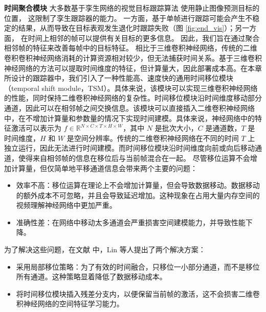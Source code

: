 \textbf{时间聚合模块}
大多数基于孪生网络的视觉目标跟踪算法 \cite{SiamRPN++, Wang2018SiamMask} 使用静止图像预测目标的位置，%
这限制了孪生跟踪器的能力。
一方面，基于单帧进行跟踪可能会产生不稳定的结果，从而导致在目标表观发生退化时跟踪失败（图 \ref{fig:end_vis}）；另一方面，
在时间上相邻的帧可以提供有关目标的更多信息。
因此，我们旨在通过聚合相邻帧的特征来改善每帧中的目标特征。
相比于三维卷积神经网络，传统的二维卷积卷积神经网络消耗的计算资源相对较少，但无法捕获时间关系。基于三维卷积神经网络的方法可以提取时间维度的特征，但计算量大，因此部署成本高。在本章所设计的跟踪器中，我们引入了一种性能高、速度快的通用时间移位模块（temporal shift module，TSM）\cite{lin2019tsm}。具体来说，该模块可以实现三维卷积神经网络的性能，同时保持二维卷积神经网络的复杂性。时间移位模块沿时间维度移动部分通道，因此可以在相邻帧之间交换信息。该模块可以直接插入二维卷积神经网络中，在不增加计算量和参数量的情况下实现时间建模。具体来说，神经网络中的特征激活可以表示为 $f \in \mathbb R^{N\times C\times T\times H\times W}$，其中 $N$ 是批次大小，$C$ 是通道数，$T$ 是时间维度，$H$ 和 $W$ 是空间分辨率。传统的二维卷积神经网络在不同的时间 $T$ 上独立运行，因此无法进行时间建模。而时间移位模块沿时间维度向前或向后移动通道，使得来自相邻帧的信息在移位后与当前帧混合在一起。
尽管移位运算不会增加计算量，但仅简单地平移通道信息会带来两个主要的问题：
\begin{itemize}
\item 效率不高：移位运算在理论上不会增加计算量，但会导致数据移动。数据移动的额外成本不可忽略，并且会导致延迟增加。这种现象在占用大量内存空间的视频理解神经网络中更加严重。
\item 准确性差：在网络中移动太多通道会严重损害空间建模能力，并导致性能下降。
\end{itemize}

为了解决这些问题，在文献 \cite{lin2019tsm} 中，Lin 等人提出了两个解决方案：
\begin{itemize}
\item 采用局部移位策略：为了有效的时间融合，只移位一小部分通道，而不是移位所有通道。这种策略显着降低了数据移动成本。
\item 将时间移位模块插入残差分支内，以便保留当前帧的激活，这不会损害二维卷积神经网络的空间特征学习能力。
\end{itemize}

